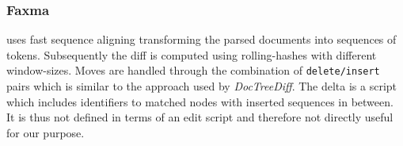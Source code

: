 \subsubsection{Faxma\cite{lindholm2006fast}}
uses fast sequence aligning transforming the parsed documents into sequences of tokens. Subsequently the diff is computed using rolling-hashes with different window-sizes. Moves are handled through the combination of \texttt{delete/insert} pairs which is similar to the approach used by \emph{DocTreeDiff}. The delta is a script which includes identifiers to matched nodes with inserted sequences in between. It is thus not defined in terms of an edit script and therefore not directly useful for our purpose.   %






